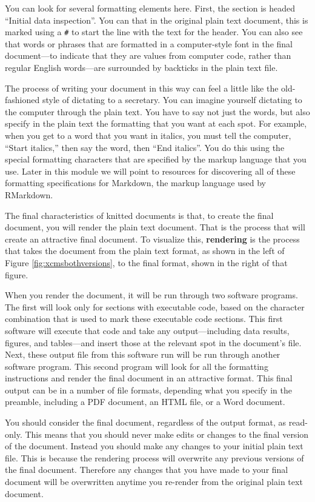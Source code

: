 \documentclass[]{tufte-book}
\begin{document}
You can look for several formatting elements here. First, the section is headed
``Initial data inspection''. You can that in the original plain text document,
this is marked using a \texttt{\#} to start the line with the text for the header. You
can also see that words or phrases that are formatted in a computer-style font
in the final document---to indicate that they are values from computer code,
rather than regular English words---are surrounded by backticks in the plain
text file.

The process of writing your document in this way can feel a little like the
old-fashioned style of dictating to a secretary. You can imagine yourself
dictating to the computer through the plain text. You have to say not just the
words, but also specify in the plain text the formatting that you want at each
spot. For example, when you get to a word that you want in italics, you must
tell the computer, ``Start italics,'' then say the word, then ``End italics''. You
do this using the special formatting characters that are specified by the markup
language that you use. Later in this module we will point to resources for
discovering all of these formatting specifications for Markdown, the markup
language used by RMarkdown.

The final characteristics of knitted documents is that, to create the final
document, you will render the plain text document. That is the process that will
create an attractive final document. To visualize this, \textbf{rendering} is the
process that takes the document from the plain text format, as shown in the left
of Figure \ref{fig:xcmsbothversions}, to the final format, shown in the right
of that figure.

When you render the document, it will be run through two software programs. The
first will look only for sections with executable code, based on the character
combination that is used to mark these executable code sections. This first
software will execute that code and take any output---including data results,
figures, and tables---and insert those at the relevant spot in the document's
file. Next, these output file from this software run will be run through another
software program. This second program will look for all the formatting
instructions and render the final document in an attractive format. This final
output can be in a number of file formats, depending what you specify in the
preamble, including a PDF document, an HTML file, or a Word document.

You should consider the final document, regardless of the output format, as
read-only. This means that you should never make edits or changes to the final
version of the document. Instead you should make any changes to your initial
plain text file. This is because the rendering process will overwrite any
previous versions of the final document. Therefore any changes that you have
made to your final document will be overwritten anytime you re-render from the
original plain text document.
\end{document}
